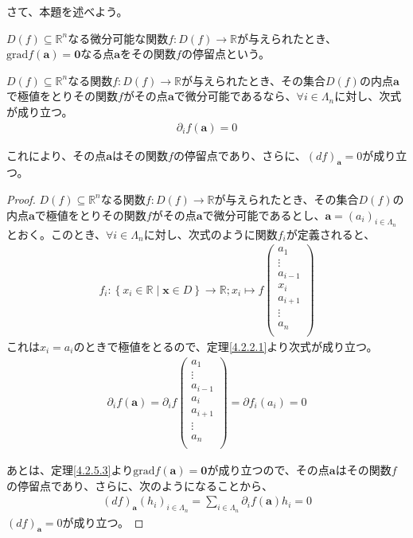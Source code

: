 \documentclass[dvipdfmx]{jsarticle}
\begin{document}
さて、本題を述べよう。
\begin{dfn}
$D(f) \subseteq \mathbb{R}^{n}$なる微分可能な関数$f:D(f) \rightarrow \mathbb{R}$が与えられたとき、$\mathrm{grad}f\left( \mathbf{a} \right) = \mathbf{0}$なる点$\mathbf{a}$をその関数$f$の停留点という。
\end{dfn}
\begin{thm}\label{4.4.3.1}
$D(f) \subseteq \mathbb{R}^{n}$なる関数$f:D(f) \rightarrow \mathbb{R}$が与えられたとき、その集合$D(f)の内点\mathbf{a}$で極値をとりその関数$f$がその点$\mathbf{a}$で微分可能であるなら、$\forall i \in \varLambda_{n}$に対し、次式が成り立つ。
\begin{align*}
\partial_{i}f\left( \mathbf{a} \right) = 0
\end{align*}\par
これにより、その点$\mathbf{a}$はその関数$f$の停留点であり、さらに、$(df)_{\mathbf{a}} = 0$が成り立つ。
\end{thm}
\begin{proof}
$D(f) \subseteq \mathbb{R}^{n}$なる関数$f:D(f) \rightarrow \mathbb{R}$が与えられたとき、その集合$D(f)$の内点$\mathbf{a}$で極値をとりその関数$f$がその点$\mathbf{a}$で微分可能であるとし、$\mathbf{a} = \left( a_{i} \right)_{i \in \varLambda_{n}}$とおく。このとき、$\forall i \in \varLambda_{n}$に対し、次式のように関数$f_{i}$が定義されると、
\begin{align*}
f_{i}:\left\{ x_{i} \in \mathbb{R} \middle| \mathbf{x} \in D \right\} \rightarrow \mathbb{R};x_{i} \mapsto f\begin{pmatrix}
a_{1} \\
 \vdots \\
a_{i - 1} \\
x_{i} \\
a_{i + 1} \\
 \vdots \\
a_{n} \\
\end{pmatrix}
\end{align*}
これは$x_{i} = a_{i}$のときで極値をとるので、定理\ref{4.2.2.1}より次式が成り立つ。
\begin{align*}
\partial_{i}f\left( \mathbf{a} \right) = \partial_{i}f\begin{pmatrix}
a_{1} \\
 \vdots \\
a_{i - 1} \\
a_{i} \\
a_{i + 1} \\
 \vdots \\
a_{n} \\
\end{pmatrix} = \partial f_{i}\left( a_{i} \right) = 0
\end{align*}\par
あとは、定理\ref{4.2.5.3}より$\mathrm{grad}f\left( \mathbf{a} \right) = \mathbf{0}$が成り立つので、その点$\mathbf{a}$はその関数$f$の停留点であり、さらに、次のようになることから、
\begin{align*}
(df)_{\mathbf{a}}\left( h_{i} \right)_{i \in \varLambda_{n}} = \sum_{i \in \varLambda_{n}} {\partial_{i}f\left( \mathbf{a} \right)h_{i}} = 0
\end{align*}
$(df)_{\mathbf{a}} = 0$が成り立つ。
\end{proof}
\end{document}
